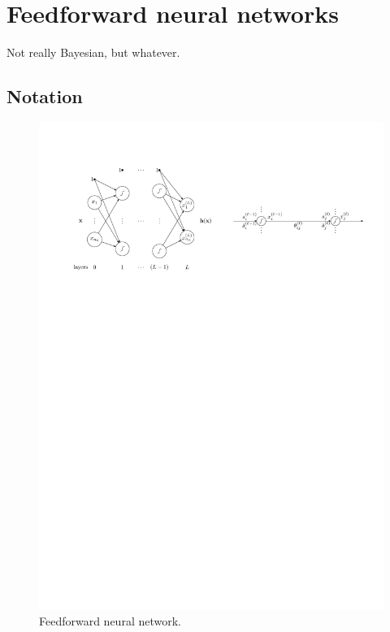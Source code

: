 \section{Feedforward neural networks}
Not really Bayesian, but whatever.
\subsection{Notation}
\begin{figure}[htb!]
    \centering
    \includegraphics[width=1\textwidth]{nnets/figures/nnet}
    \caption{Feedforward neural network.}
\end{figure}

